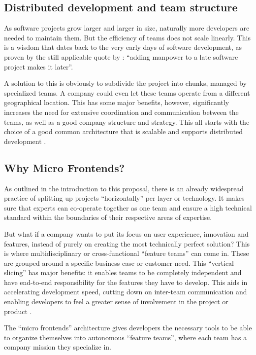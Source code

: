 \subsection{Distributed development and team structure}
As software projects grow larger and larger in size, naturally more developers
are needed to maintain them. But the efficiency of teams does not scale
linearly. This is a wisdom that dates back to the very early days of software
development, as proven by the still applicable quote by \textcite{Brooks_1975}:
``adding manpower to a late software project makes it later''.

A solution to this is obviously to subdivide the project into chunks, managed by
specialized teams. A company could even let these teams operate from a different
geographical location. This has some major benefits, however, significantly
increases the need for extensive coordination and communication between the
teams, as well as a good company structure and strategy. This all starts with
the choice of a good common architecture that is scalable and supports
distributed development \autocite{Yuhong_2008}. 

\subsection{Why Micro Frontends?}

As outlined in the introduction to this proposal, there is an already widespread
practice of splitting up projects ``horizontally'' per layer or technology. It
makes sure that experts can co-operate together as one team and ensure a high
technical standard within the boundaries of their respective areas of expertise.

But what if a company wants to put its focus on user experience, innovation and
features, instead of purely on creating the most technically perfect solution?
This is where multidisciplinary or cross-functional ``feature teams'' can come in.
These are grouped around a specific business case or customer need. This
``vertical slicing'' has major benefits: it enables teams to be completely
independent and have end-to-end responsibility for the features they have to
develop. This aids in accelerating development speed, cutting down on inter-team
communication and enabling developers to feel a greater sense of involvement in
the project or product \autocite{LarmanVodde_2008}.

The ``micro frontends'' architecture gives developers the necessary tools to be
able to organize themselves into autonomous ``feature teams'', where each team
has a company mission they specialize in.
\autocite{Geers_2020}


